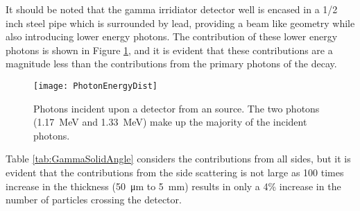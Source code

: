 It should be noted that the gamma irridiator detector well is encased in a 1/2 inch steel pipe which is surrounded by lead, providing a beam like geometry while also introducing lower energy photons. 
The contribution of these lower energy photons is shown in Figure \ref{fig:PhotonFluxAllEnergies}, and it is evident that these contributions are a magnitude less than the contributions from the primary photons of the  decay.
\begin{figure}
  \texttt{[image: PhotonEnergyDist]}
	\caption[Photons Incident upon Detector]{Photons incident upon a detector from an  source.  The two  photons (\SI{1.17}{\MeV} and \SI{1.33}{\MeV}) make up the majority of the incident photons.}
  \label{fig:PhotonFluxAllEnergies}
\end{figure}
Table \ref{tab:GammaSolidAngle} considers the contributions from all sides, but it is evident that the contributions from the side scattering is not large as 100 times increase in the thickness (\SI{50}{\um} to \SI{5}{\mm}) results in only a 4\% increase in the number of particles crossing the detector.

